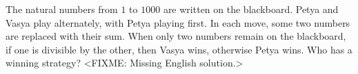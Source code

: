 \problem{}
The natural numbers from $1$ to $1000$ are written on the blackboard.
Petya and Vasya play alternately, with Petya playing first.
In each move, some two numbers are replaced with their sum.
When only two numbers remain on the blackboard, if one is divisible by the
other, then Vasya wins, otherwise Petya wins.
Who has a winning strategy?
\solution
<FIXME: Missing English solution.>
\endproblem
